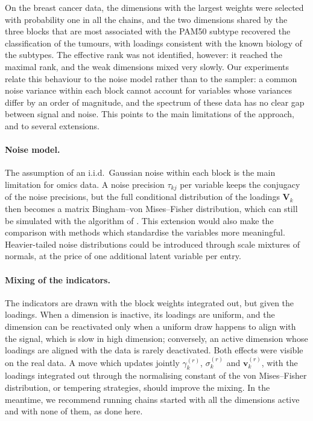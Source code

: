 \documentclass[11pt]{article}
\newcommand{\V}{\mathbf{V}}
\newcommand{\vv}{\mathbf{v}}
\begin{document}
On the breast cancer data, the dimensions with the largest weights were selected with probability one in all the chains, and the two dimensions shared by the three blocks that are most associated with the PAM50 subtype recovered the classification of the tumours, with loadings consistent with the known biology of the subtypes. The effective rank was not identified, however: it reached the maximal rank, and the weak dimensions mixed very slowly. Our experiments relate this behaviour to the noise model rather than to the sampler: a common noise variance within each block cannot account for variables whose variances differ by an order of magnitude, and the spectrum of these data has no clear gap between signal and noise. This points to the main limitations of the approach, and to several extensions.
 
\paragraph{Noise model.} The assumption of an i.i.d.\ Gaussian noise within each block is the main limitation for omics data. A noise precision $\tau_{kj}$ per variable keeps the conjugacy of the noise precisions, but the full conditional distribution of the loadings $\V_k$ then becomes a matrix Bingham--von Mises--Fisher distribution, which can still be simulated with the algorithm of \citet{hoff2009}. This extension would also make the comparison with methods which standardise the variables more meaningful. Heavier-tailed noise distributions could be introduced through scale mixtures of normals, at the price of one additional latent variable per entry.
 
\paragraph{Mixing of the indicators.} The indicators are drawn with the block weights integrated out, but given the loadings. When a dimension is inactive, its loadings are uniform, and the dimension can be reactivated only when a uniform draw happens to align with the signal, which is slow in high dimension; conversely, an active dimension whose loadings are aligned with the data is rarely deactivated. Both effects were visible on the real data. A move which updates jointly $\gamma_k^{(r)}$, $\sigma_k^{(r)}$ and $\vv_k^{(r)}$, with the loadings integrated out through the normalising constant of the von Mises--Fisher distribution, or tempering strategies, should improve the mixing. In the meantime, we recommend running chains started with all the dimensions active and with none of them, as done here.
 
\end{document}
